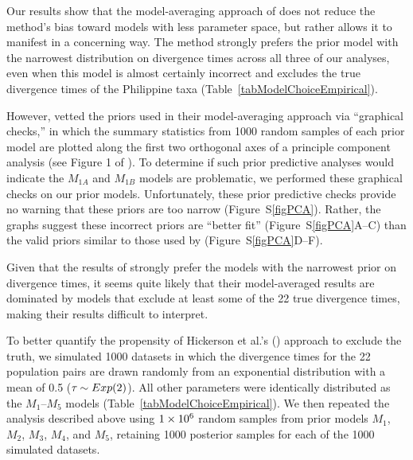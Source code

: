 \documentclass[letterpaper,12pt]{article}
\begin{document}
\begin{linenumbers}
Our results show that the model-averaging approach of \citet{Hickerson2013}
does not reduce the method's bias toward models with less parameter space,
but rather allows it to manifest in a concerning way.
The method strongly prefers the prior model with the narrowest distribution on
divergence times across all three of our analyses, even when this model is
almost certainly incorrect and excludes the true divergence times of the
Philippine taxa (Table~\ref{tabModelChoiceEmpirical}).

However, \citet{Hickerson2013} vetted the priors used in their model-averaging
approach via ``graphical checks,'' in which the summary statistics from 1000
random samples of each prior model are plotted along the first two orthogonal
axes of a principle component analysis (see Figure 1 of \citet{Hickerson2013}).
To determine if such prior predictive analyses would indicate the $M_{1A}$ and
$M_{1B}$ models are problematic, we performed these graphical checks on our
prior models.
Unfortunately, these prior predictive checks provide no warning that these
priors are too narrow (Figure~S\ref{figPCA}).
Rather, the graphs suggest these incorrect priors are ``better fit''
(Figure~S\ref{figPCA}A--C) than the valid priors similar to those used by
\citet{Oaks2012} (Figure~S\ref{figPCA}D--F).

Given that the results of \citet{Hickerson2013} strongly prefer the models with
the narrowest prior on divergence times, it seems quite likely that their
model-averaged results are dominated by models that exclude at least some of
the 22 true divergence times, making their results difficult to interpret.


To better quantify the propensity of Hickerson et al.'s
(\citeyear{Hickerson2013}) approach to exclude the truth, we simulated 1000
datasets in which the divergence times for the 22 population pairs are drawn
randomly from an exponential distribution with a mean of 0.5 ($\tau_{} \sim
Exp(2)$).
All other parameters were identically distributed as the $M_1$--$M_5$ models
(Table~\ref{tabModelChoiceEmpirical}).
We then repeated the analysis described above using $1\times 10^{6}$ random samples from
prior models $M_1$, $M_2$, $M_3$, $M_4$, and $M_5$, retaining 1000 posterior
samples for each of the 1000 simulated datasets.


\end{linenumbers}
\end{document}
